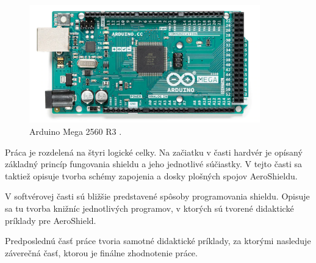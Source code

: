 \begin{figure}[!tbh]
	\centering
	\includegraphics[width=100mm]{obr/mega.png}
	\caption{{Arduino Mega 2560 R3 \cite{megafoto}.}}\label{OBRAZOK 1.32}
\end{figure}

\newpage
Práca je rozdelená na štyri logické celky. Na začiatku v časti hardvér je opísaný základný princíp fungovania shieldu a jeho jednotlivé súčiastky. V tejto časti sa taktiež opisuje tvorba schémy zapojenia a dosky plošných spojov AeroShieldu. 

V softvérovej časti sú bližšie predstavené spôsoby programovania shieldu. Opisuje sa tu tvorba knižníc jednotlivých programov, v ktorých sú tvorené didaktické príklady pre AeroShield.

Predposlednú časť práce tvoria samotné didaktické príklady, za ktorými nasleduje záverečná časť, ktorou je finálne zhodnotenie práce.




